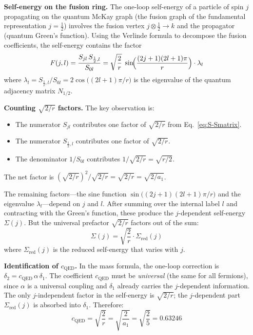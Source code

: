 \documentclass[12pt,a4paper]{article}
\theoremstyle{definition}
\begin{document}
\textbf{Self-energy on the fusion ring.}  The one-loop self-energy of a particle of spin $j$ propagating on the quantum McKay graph (the fusion graph of the fundamental representation $j = \tfrac{1}{2}$) involves the fusion vertex $j \otimes \tfrac{1}{2} \to k$ and the propagator (quantum Green's function).  Using the Verlinde formula to decompose the fusion coefficients, the self-energy contains the factor
\begin{equation}
F(j,l) = \frac{S_{jl}\,S_{\frac{1}{2},l}}{S_{0l}} = \sqrt{\frac{2}{r}}\;\sin\!\Bigl(\frac{(2j+1)(2l+1)\pi}{r}\Bigr) \cdot \lambda_l
\label{eq:S-Fjl}
\end{equation}
where $\lambda_l = S_{\frac{1}{2},l}/S_{0l} = 2\cos\bigl((2l+1)\pi/r\bigr)$ is the eigenvalue of the quantum adjacency matrix $N_{1/2}$.

\textbf{Counting $\sqrt{2/r}$ factors.}  The key observation is:
\begin{itemize}
\item The numerator $S_{jl}$ contributes one factor of $\sqrt{2/r}$ from Eq.~\eqref{eq:S-Smatrix}.
\item The numerator $S_{\frac{1}{2},l}$ contributes one factor of $\sqrt{2/r}$.
\item The denominator $1/S_{0l}$ contributes $1/\sqrt{2/r} = \sqrt{r/2}$.
\end{itemize}
The net factor is $(\sqrt{2/r})^2 / \sqrt{2/r} = \sqrt{2/r} = \sqrt{2/a_1}$.

The remaining factors---the sine function $\sin\bigl((2j+1)(2l+1)\pi/r\bigr)$ and the eigenvalue $\lambda_l$---depend on $j$ and $l$.  After summing over the internal label $l$ and contracting with the Green's function, these produce the $j$-dependent self-energy $\Sigma(j)$.  But the universal prefactor $\sqrt{2/r}$ factors out of the sum:
\begin{equation}
\Sigma(j) = \sqrt{\frac{2}{r}} \cdot \Sigma_{\text{red}}(j)
\end{equation}
where $\Sigma_{\text{red}}(j)$ is the reduced self-energy that varies with $j$.

\textbf{Identification of $c_{\text{QED}}$.}  In the mass formula, the one-loop correction is $\delta_2 = c_{\text{QED}}\,\alpha\,\delta_1$.  The coefficient $c_{\text{QED}}$ must be \emph{universal} (the same for all fermions), since $\alpha$ is a universal coupling and $\delta_1$ already carries the $j$-dependent information.  The only $j$-independent factor in the self-energy is $\sqrt{2/r}$; the $j$-dependent part $\Sigma_{\text{red}}(j)$ is absorbed into $\delta_1$.  Therefore:
\begin{equation}
\boxed{c_{\text{QED}} = \sqrt{\frac{2}{r}} = \sqrt{\frac{2}{a_1}} = \sqrt{\frac{2}{5}} = 0.63246}
\end{equation}
\end{document}
